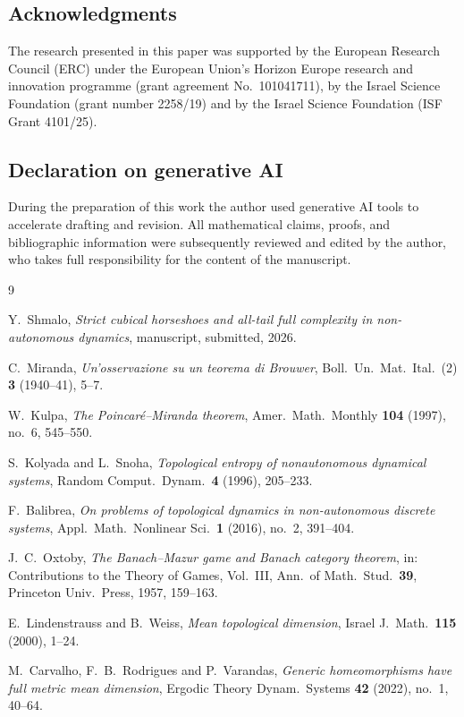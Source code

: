 \documentclass[11pt]{article}
\begin{document}
\subsection*{Acknowledgments}
The research presented in this paper was supported by the European Research Council
(ERC) under the European Union's Horizon Europe research and innovation programme
(grant agreement No.\ 101041711), by the Israel Science Foundation (grant number
2258/19) and by the Israel Science Foundation (ISF Grant 4101/25).

\subsection*{Declaration on generative AI}
During the preparation of this work the author used generative AI tools to accelerate
drafting and revision.  All mathematical claims, proofs, and bibliographic information
were subsequently reviewed and edited by the author, who takes full responsibility for
the content of the manuscript.

\begin{thebibliography}{9}

Y.~Shmalo,
\emph{Strict cubical horseshoes and all-tail full complexity in non-autonomous
dynamics}, manuscript, submitted, 2026.

C.~Miranda,
\emph{Un'osservazione su un teorema di Brouwer},
Boll.\ Un.\ Mat.\ Ital.\ (2) \textbf{3} (1940--41), 5--7.

W.~Kulpa,
\emph{The Poincar\'e--Miranda theorem},
Amer.\ Math.\ Monthly \textbf{104} (1997), no.~6, 545--550.

S.~Kolyada and L.~Snoha,
\emph{Topological entropy of nonautonomous dynamical systems},
Random Comput.\ Dynam.\ \textbf{4} (1996), 205--233.

F.~Balibrea,
\emph{On problems of topological dynamics in non-autonomous discrete systems},
Appl.\ Math.\ Nonlinear Sci.\ \textbf{1} (2016), no.~2, 391--404.

J.~C.~Oxtoby,
\emph{The Banach--Mazur game and Banach category theorem},
in: Contributions to the Theory of Games, Vol.~III,
Ann.\ of Math.\ Stud.\ \textbf{39}, Princeton Univ.\ Press, 1957, 159--163.

E.~Lindenstrauss and B.~Weiss,
\emph{Mean topological dimension},
Israel J.\ Math.\ \textbf{115} (2000), 1--24.

M.~Carvalho, F.~B.~Rodrigues and P.~Varandas,
\emph{Generic homeomorphisms have full metric mean dimension},
Ergodic Theory Dynam.\ Systems \textbf{42} (2022), no.~1, 40--64.

\end{thebibliography}
\end{document}

